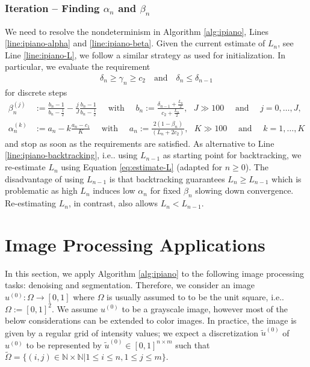\documentclass[onecolumn,final,a4paper,13pt,reqno]{siamart}
\makeatletter
\DeclareRobustCommand\onedot{\futurelet\@let@token\@onedot}
\def\@onedot{\ifx\@let@token.\else.\null\fi\xspace}
\def\ie{{i.e}\onedot} \def\Ie{{I.e}\onedot}
\makeatother
\begin{document}
\subsubsection{Iteration -- Finding $\alpha_n$ and $\beta_n$}

We need to resolve the nondeterminism in Algorithm \ref{alg:ipiano}, Lines \ref{line:ipiano-alpha} and \ref{line:ipiano-beta}. Given the current estimate of $L_n$, see Line \ref{line:ipiano-L}, we follow a similar strategy as used for initialization. In particular, we evaluate the requirement
\begin{align}
	\delta_n \geq \gamma_n \geq c_2\quad\text{and}\quad \delta_{n} \leq \delta_{n - 1}
\end{align}
for discrete steps
\begin{align}
	\beta_n^{(j)} &:= \frac{b_n - 1}{b_n - \frac{1}{2}} - \frac{j}{J} \frac{b_n - 1}{b_n - \frac{1}{2}}\quad\text{ with }\quad b_n := \frac{\delta_{n - 1} + \frac{L_n}{2}}{c_2 + \frac{L_n}{2}},\text{ }J \gg 100\quad\text{ and }\quad j = 0,\ldots,J,\\
	\alpha_n^{(k)} &:= a_n - k\frac{a_n - c_1}{K}\quad\text{ with }\quad a_n := \frac{2(1 - \beta_n)}{(L_n + 2 c_2)},\text{ }K \gg 100\quad\text{ and }\quad k = 1,\ldots,K
\end{align}
and stop as soon as the requirements are satisfied. As alternative to Line \ref{line:ipiano-backtracking}, \ie using $L_{n - 1}$ as starting point for backtracking, we re-estimate $L_n$ using Equation \eqref{eq:estimate-L} (adapted for $n \geq 0$). The disadvantage of using $L_{n - 1}$ is that backtracking guarantees $L_{n} \geq L_{n - 1}$ which is problematic as high $L_n$ induces low $\alpha_n$ for fixed $\beta_n$ slowing down convergence. Re-estimating $L_n$, in contrast, also allows $L_n < L_{n - 1}$.

\section{Image Processing Applications}
\label{sec:applications}

In this section, we apply Algorithm \ref{alg:ipiano} to the following image processing tasks: denoising and segmentation. Therefore, we consider an image $u^{(0)} : \Omega \rightarrow [0,1]$ where $\Omega$ is usually assumed to to be the unit square, \ie $\Omega := [0,1]^2$. We assume $u^{(0)}$ to be a grayscale image, however most of the below considerations can be extended to color images. In practice, the image is given by a regular grid of intensity values; we expect a discretization $\tilde{u}^{(0)}$ of $u^{(0)}$ to be represented by $\tilde{u}^{(0)} \in [0,1]^{n \times m}$ such that $\tilde{\Omega} = \{(i, j) \in \mathbb{N} \times \mathbb{N}| 1 \leq i \leq n, 1 \leq j \leq m\}$.
\end{document}
